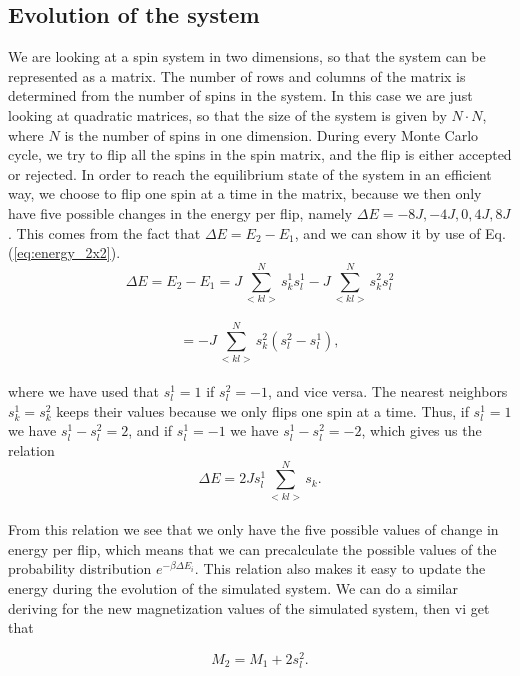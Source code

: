\documentclass[12pt]{article}
\begin{document}
\begin{flushleft}
\subsection{Evolution of the system}
We are looking at a spin system in two dimensions, so that the system can be represented as a matrix. The number of rows and columns of the matrix is determined from the number of spins in the system. In this case we are just looking at quadratic matrices, so that the size of the system is given by $N\cdot N$, where $N$ is the number of spins in one dimension. During every Monte Carlo cycle, we try to flip all the spins in the spin matrix, and the flip is either accepted or rejected. In order to reach the equilibrium state of the system in an efficient way, we choose to flip one spin at a time in the matrix, because we then only have five possible changes in the energy per flip, namely $\Delta E = -8J, -4J, 0, 4J, 8J$. This comes from the fact that $\Delta E = E_2 - E_1$, and we can show it by use of Eq. (\ref{eq:energy_2x2}).
\vspace{5mm}
$$\Delta E = E_2 - E_1 = J\sum\limits_{<kl>}^{N}s_k^1 s_l^1 -J\sum\limits_{<kl>}^{N}s_k^2 s_l^2$$\\
\vspace{5mm}
$$ = -J\sum\limits_{<kl>}^{N} s_k^2(s_l^2 -  s_l^1),$$\\
\vspace{5mm}
where we have used that $s_l^1 = 1$ if $s_l^2 = -1$, and vice versa. The nearest neighbors $s_k^1 = s_k^2$ keeps their values because we only flips one spin at a time. Thus, if $s_l^1 = 1$ we have $s_l^1 - s_l^2 = 2$, and if $s_l^1 = -1$ we have $s_l^1 - s_l^2 = -2$, which gives us the relation
\vspace{5mm}
$$\Delta E = 2Js_l^1\sum\limits_{<kl>}^{N} s_k.$$\\
\vspace{5mm} 
From this relation we see that we only have the five possible values of change in energy per flip, which means that we can precalculate the possible values of the probability distribution $e^{-\beta\Delta E_i}$. This relation also makes it easy to update the energy during the evolution of the simulated system. We can do a similar deriving for the new magnetization values of the simulated system, then vi get that

$$M_2 = M_1 + 2s_l^2.$$\\ 


\end{flushleft}
\end{document}
